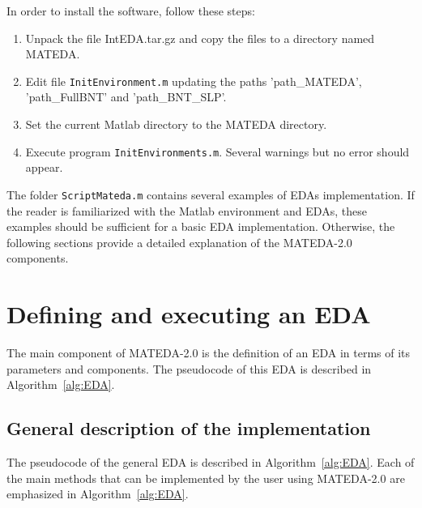 \documentclass[a4paper]{article}
\begin{document}
In order to install the software, follow these steps:

\begin{enumerate}
  \item Unpack the file IntEDA.tar.gz and copy the files to a directory
  named MATEDA.
  \item Edit file \texttt{InitEnvironment.m} updating the paths
   'path\_MATEDA', \\ 'path\_FullBNT' and  'path\_BNT\_SLP'.
  \item Set the current Matlab directory to the MATEDA directory.
  \item Execute program \texttt{InitEnvironments.m}. Several warnings  but no error should appear.
\end{enumerate}

The folder \texttt{ScriptMateda.m} contains several  examples of EDAs implementation. If the reader is familiarized with the Matlab environment and EDAs,
these examples should be sufficient for a basic EDA implementation. Otherwise, the following sections
provide a detailed explanation of the  MATEDA-2.0 components.

\section{Defining and executing an EDA}

 The main component of MATEDA-2.0 is the definition of an EDA in
 terms of its parameters and components.  The pseudocode of this  EDA is described in
 Algorithm~\ref{alg:EDA}.



\subsection{General description of the implementation}

 The pseudocode of the general EDA is described in
 Algorithm~\ref{alg:EDA}. Each of the main methods that can be implemented by the user using  MATEDA-2.0 are
 emphasized in Algorithm~\ref{alg:EDA}.
\end{document}
